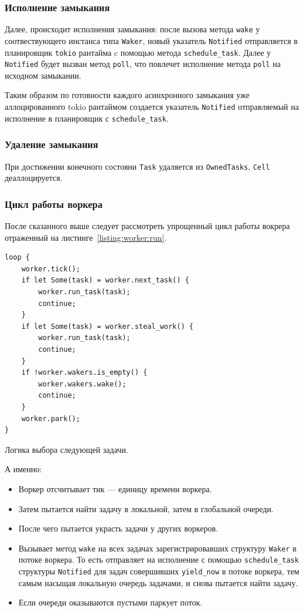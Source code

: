 \subsubsection{Исполнение замыкания}

Далее, происходит исполнения замыкания: после вызова метода \verb|wake| у соотвествующего инстанса типа \verb|Waker|, новый указатель \verb|Notified| отправляется в планировщик \verb|tokio| рантайма c помощью метода \verb|schedule_task|. Далее у \verb|Notified| будет вызван метод \verb|poll|, что повлечет исполнение метода \verb|poll| на исходном замыкании.

Таким образом по готовности каждого асинхронного замыкания уже аллоцированного tokio рантаймом создается указатель \verb|Notified| отправляемый на исполнение в планировщик с \verb|schedule_task|.

\subsubsection{Удаление замыкания}

При достижении конечного состояни \verb|Task| удаляется из \verb|OwnedTasks|, \verb|Cell| деаллоцируется.

\subsubsection{Цикл работы воркера}

После сказанного выше следует рассмотреть упрощенный цикл работы вокрера отраженный на листинге~\ref{listing:worker:run}.

\begin{listing}[H]
    \begin{verbatim}
loop {
    worker.tick();
    if let Some(task) = worker.next_task() {
        worker.run_task(task);
        continue;
    }
    if let Some(task) = worker.steal_work() {
        worker.run_task(task);
        continue;
    }
    if !worker.wakers.is_empty() {
        worker.wakers.wake();
        continue;
    }
    worker.park();
}
    \end{verbatim}

    \caption{Логика выбора следующей задачи.}
    \label{listing:worker:run}
\end{listing}

А именно:

\begin{itemize}
    \item Воркер отсчитывает тик --- единицу времени воркера.
    \item Затем пытается найти задачу в локальной, затем в глобальной очереди.
    \item После чего пытается украсть задачи у других воркеров.
    \item Вызывает метод \verb|wake| на всех задачах зарегистрировавших структуру \verb|Waker| в потоке воркера. То есть отправляет на исполнение с помощью \verb|schedule_task| структуры \verb|Notified| для задач совершивших \verb|yield_now| в потоке воркера, тем самым насыщая локальную очередь задачами, и снова пытается найти задачу.
    \item Если очереди оказываются пустыми паркует поток.
\end{itemize}

